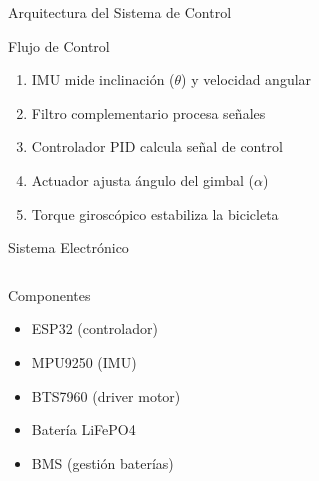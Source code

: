 \documentclass[10pt,xcolor={dvipsnames}]{beamer}
\begin{document}
\begin{frame}{Arquitectura del Sistema de Control}
\begin{center}
\end{center}

\vspace{0.3cm}
\begin{block}{Flujo de Control}
\begin{enumerate}
    \item IMU mide inclinación ($\theta$) y velocidad angular
    \item Filtro complementario procesa señales
    \item Controlador PID calcula señal de control
    \item Actuador ajusta ángulo del gimbal ($\alpha$)
    \item Torque giroscópico estabiliza la bicicleta
\end{enumerate}
\end{block}
\end{frame}

\begin{frame}{Sistema Electrónico}
\begin{columns}
\begin{block}{Componentes}
\begin{itemize}
    \item ESP32 (controlador)
    \item MPU9250 (IMU)
    \item BTS7960 (driver motor)
    \item Batería LiFePO4
    \item BMS (gestión baterías)
\end{itemize}
\end{block}

\vspace{0.2cm}
\end{columns}

\vspace{0.3cm}
\begin{center}
\end{center}
\end{frame}
\end{document}
